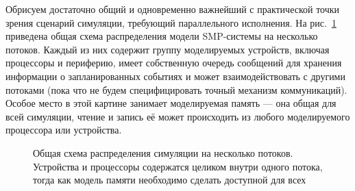 Обрисуем достаточно общий и одновременно важнейший с практической точки зрения сценарий симуляции, требующий параллельного исполнения. На рис.~\ref{fig:parsim-overview} приведена общая схема распределения модели SMP-системы на несколько потоков. Каждый из них содержит группу моделируемых устройств, включая процессоры и периферию, имеет собственную очередь сообщений для хранения информации о запланированных событиях и может взаимодействовать с другими потоками (пока что не будем специфицировать точный механизм коммуникаций). Особое место в этой картине занимает моделируемая память --- она общая для всей симуляции, чтение и запись её может происходить из любого моделируемого процессора или устройства.

\begin{figure}[htbp]
	\centering
	\caption[Общая схема распределения симуляции на несколько потоков]{Общая схема распределения симуляции на несколько потоков. Устройства и процессоры содержатся целиком внутри одного потока, тогда как модель памяти необходимо сделать доступной для всех}
	\label{fig:parsim-overview}
\end{figure}

